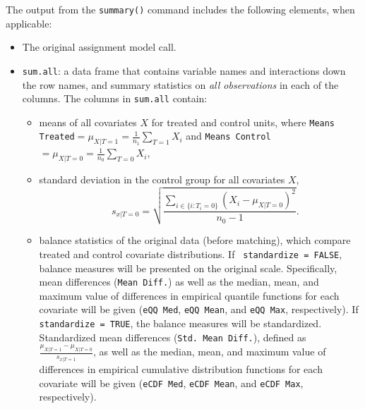 The output from the \texttt{summary()} command includes the following
elements, when applicable:
\begin{itemize}
\item The original assignment model call.
\item \texttt{sum.all}: a data frame that contains variable names and
  interactions down the row names, and summary statistics on \emph{all
    observations} in each of the columns.  The columns in
  \texttt{sum.all} contain: 
  \begin{itemize}
  \item means of all covariates $X$ for treated and control units,
    where \texttt{Means Treated}$= \mu_{X|T=1} = \frac{1}{n_1}
    \sum_{T=1} X_i$ and \texttt{Means Control}$= \mu_{X|T=0} =
    \frac{1}{n_0} \sum_{T=0} X_i$,
 \item standard deviation in the control group for all covariates $X$,  
        $$\quad s_{x|T=0} = \sqrt{\frac{\sum_{i \in \{i: T_i=0\}}
        (X_i - \mu_{X|T=0})^2}{n_0-1} }.$$
  \item balance statistics of the original data (before matching),
    which compare treated and control covariate distributions. If {\tt
      standardize = FALSE}, balance measures will be presented on the
    original scale. Specifically, mean differences (\texttt{Mean
      Diff.}) as well as the median, mean, and maximum value of
    differences in empirical quantile functions for each covariate
    will be given (\texttt{eQQ Med}, \texttt{eQQ Mean}, and
    \texttt{eQQ Max}, respectively). If {\tt standardize = TRUE}, the
    balance measures will be standardized.  Standardized mean
    differences (\texttt{Std. Mean Diff.}), defined as
    $\frac{\mu_{X|T=1} - \mu_{X|T=0}}{s_{x|T=1}}$, as well as the
    median, mean, and maximum value of differences in empirical
    cumulative distribution functions for each covariate will be given
    (\texttt{eCDF Med}, \texttt{eCDF Mean}, and \texttt{eCDF Max},
    respectively).
  \end{itemize}
  

\end{itemize}
